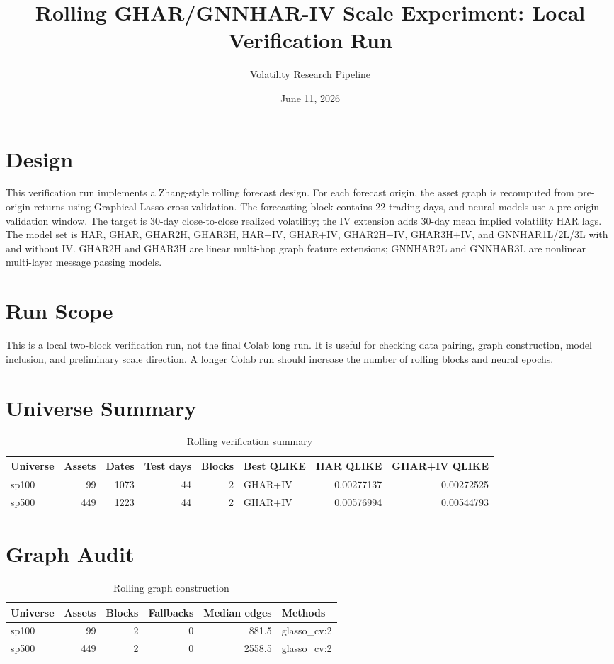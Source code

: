 \documentclass[11pt]{article}
\title{Rolling GHAR/GNNHAR-IV Scale Experiment: Local Verification Run}
\author{Volatility Research Pipeline}
\date{June 11, 2026}
\begin{document}
\maketitle
\section{Design}
This verification run implements a Zhang-style rolling forecast design. For each forecast origin, the asset graph is recomputed from pre-origin returns using Graphical Lasso cross-validation. The forecasting block contains 22 trading days, and neural models use a pre-origin validation window. The target is 30-day close-to-close realized volatility; the IV extension adds 30-day mean implied volatility HAR lags.
The model set is HAR, GHAR, GHAR2H, GHAR3H, HAR+IV, GHAR+IV, GHAR2H+IV, GHAR3H+IV, and GNNHAR1L/2L/3L with and without IV. GHAR2H and GHAR3H are linear multi-hop graph feature extensions; GNNHAR2L and GNNHAR3L are nonlinear multi-layer message passing models.
\section{Run Scope}
This is a local two-block verification run, not the final Colab long run. It is useful for checking data pairing, graph construction, model inclusion, and preliminary scale direction. A longer Colab run should increase the number of rolling blocks and neural epochs.
\section{Universe Summary}
\begin{table}[h]
\centering
\small
\caption{Rolling verification summary}
\begin{tabular}{lrrrrlrr}
\toprule
Universe & Assets & Dates & Test days & Blocks & Best QLIKE & HAR QLIKE & GHAR+IV QLIKE \\
\midrule
sp100 & 99 & 1073 & 44 & 2 & GHAR+IV & 0.00277137 & 0.00272525 \\
sp500 & 449 & 1223 & 44 & 2 & GHAR+IV & 0.00576994 & 0.00544793 \\
\bottomrule
\end{tabular}
\end{table}
\section{Graph Audit}
\begin{table}[h]
\centering
\small
\caption{Rolling graph construction}
\begin{tabular}{lrrrrl}
\toprule
Universe & Assets & Blocks & Fallbacks & Median edges & Methods \\
\midrule
sp100 & 99 & 2 & 0 & 881.5 & glasso\_cv:2 \\
sp500 & 449 & 2 & 0 & 2558.5 & glasso\_cv:2 \\
\bottomrule
\end{tabular}
\end{table}
\end{document}
